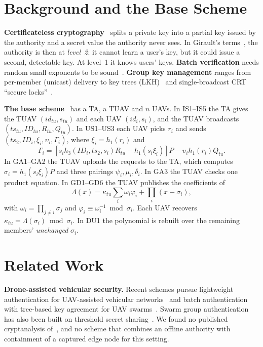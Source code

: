 \documentclass[conference]{IEEEtran}
\begin{document}
\section{Background and the Base Scheme}\label{sec:base}
\textbf{Certificateless cryptography}~\cite{alriyami} splits a private key into a partial key issued by the authority and a secret value the authority never
sees. In Girault's terms~\cite{girault}, the authority is then at \emph{level~2}: it cannot learn a user's key, but it could issue a second, detectable key. At
level~1 it knows users' keys. \textbf{Batch verification} needs random small exponents to be sound~\cite{bgr}. \textbf{Group key management} ranges from per-member
(unicast) delivery to key trees (LKH)~\cite{lkh} and single-broadcast CRT ``secure locks''~\cite{securelock}.

\textbf{The base scheme}~\cite{base} has a TA, a TUAV and $n$ UAVs. In IS1--IS5 the TA gives the TUAV $(id_{tu},s_{tu})$ and each UAV $(id_i,s_i)$, and the TUAV
broadcasts $(ts_{tu},ID_{tu},R_{tu},Q_{tu})$. In US1--US3 each UAV picks $r_i$ and sends $(ts_2,ID_i,\xi_i,\upsilon_i,\Gamma_i)$, where $\xi_i=h_1(r_i)$ and
\begin{equation}
\Gamma_i=[s_ih_3(ID_i,ts_2,s_i)R_{tu}-h_1(s_i\xi_i)]P-\upsilon_ih_1(r_i)Q_{tu}.\label{eq:gamma}
\end{equation}
In GA1--GA2 the TUAV uploads the requests to the TA, which computes $\sigma_i=h_1(s_i\xi_i)P$ and three pairings $\psi_i,\mu_i,\delta_i$. In GA3 the TUAV
checks one product equation. In GD1--GD6 the TUAV publishes the coefficients of
\begin{equation}
\Lambda(x)=\kappa_{tu}\textstyle\sum_i\omega_i\varphi_i+\prod_i(x-\sigma_i),\label{eq:lambda}
\end{equation}
with $\omega_i=\prod_{j\ne i}\sigma_j$ and $\varphi_i\equiv\omega_i^{-1}\bmod\sigma_i$. Each UAV recovers $\kappa_{tu}=\Lambda(\sigma_i)\bmod\sigma_i$. In DU1 the
polynomial is rebuilt over the remaining members' \emph{unchanged} $\sigma_i$.

\section{Related Work}\label{sec:related}
\textbf{Drone-assisted vehicular security.} Recent schemes pursue lightweight authentication for UAV-assisted vehicular networks~\cite{kumar26,ahmed26} and batch
authentication with tree-based key agreement for UAV swarms~\cite{cubat}. Swarm group authentication has also been built on threshold secret sharing~\cite{aydin}. We
found no published cryptanalysis of~\cite{base}, and no scheme that combines an offline authority with containment of a captured edge node for this setting.
\end{document}
